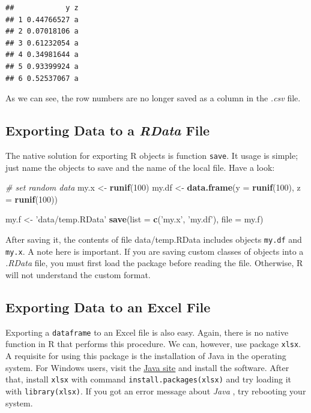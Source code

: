 \documentclass[11pt,]{book}
\newenvironment{Shaded}{\begin{snugshade}}{\end{snugshade}}
\newcommand{\KeywordTok}[1]{\textcolor[rgb]{0.27,0.27,0.27}{\textbf{#1}}}
\newcommand{\DataTypeTok}[1]{\textcolor[rgb]{0.27,0.27,0.27}{#1}}
\newcommand{\DecValTok}[1]{\textcolor[rgb]{0.06,0.06,0.06}{#1}}
\newcommand{\StringTok}[1]{\textcolor[rgb]{0.5,0.5,0.5}{#1}}
\newcommand{\CommentTok}[1]{\textcolor[rgb]{0.56,0.35,0.01}{\textit{#1}}}
\newcommand{\NormalTok}[1]{#1}
\begin{document}
\begin{verbatim}
##            y z
## 1 0.44766527 a
## 2 0.07018106 a
## 3 0.61232054 a
## 4 0.34981644 a
## 5 0.93399924 a
## 6 0.52537067 a
\end{verbatim}

As we can see, the row numbers are no longer saved as a column in the
\emph{.csv} file.

\subsection{\texorpdfstring{Exporting Data to a \emph{RData}
File}{Exporting Data to a RData File}}\label{exporting-data-to-a-rdata-file}

The native solution for exporting R objects is function \texttt{save}.
It usage is simple; just name the objects to save and the name of the
local file. Have a look:

\begin{Shaded}
\begin{Highlighting}[]
\CommentTok{# set random data}
\NormalTok{my.x <-}\StringTok{ }\KeywordTok{runif}\NormalTok{(}\DecValTok{100}\NormalTok{)}
\NormalTok{my.df <-}\StringTok{ }\KeywordTok{data.frame}\NormalTok{(}\DataTypeTok{y =} \KeywordTok{runif}\NormalTok{(}\DecValTok{100}\NormalTok{),}
                    \DataTypeTok{z =} \KeywordTok{runif}\NormalTok{(}\DecValTok{100}\NormalTok{))}

\NormalTok{my.f <-}\StringTok{ 'data/temp.RData'}
\KeywordTok{save}\NormalTok{(}\DataTypeTok{list =} \KeywordTok{c}\NormalTok{(}\StringTok{'my.x'}\NormalTok{, }\StringTok{'my.df'}\NormalTok{),}
     \DataTypeTok{file =}\NormalTok{ my.f)}
\end{Highlighting}
\end{Shaded}

After saving it, the contents of file data/temp.RData includes objects
\texttt{my.df} and \texttt{my.x}. A note here is important. If you are
saving custom classes of objects into a \emph{.RData} file, you must
first load the package before reading the file. Otherwise, R will not
understand the custom format.

\subsection{Exporting Data to an Excel
File}\label{exporting-data-to-an-excel-file}

Exporting a \texttt{dataframe} to an Excel file is also easy. Again,
there is no native function in R that performs this procedure. We can,
however, use package \texttt{xlsx}. A requisite for using this package
is the installation of Java in the operating system. For Windows users,
visit the \href{https://www.java.com/pt_BR/}{Java site} and install the
software. After that, install \texttt{xlsx} with command
\texttt{install.packages(\textquotesingle{}xlsx\textquotesingle{})} and
try loading it with \texttt{library(xlsx)}. If you got an error message
about \emph{Java} , try rebooting your system. 
\end{document}
